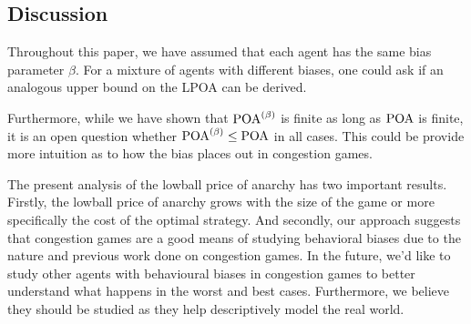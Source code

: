 \documentclass[twoside]{article}
\begin{document}
\begin{multicols}{2}

\section{Discussion}
Throughout this paper, we have assumed that each agent has the same bias
parameter $\beta$. For a mixture of agents with different biases, one could ask
if an analogous upper bound on the LPOA can be derived.

Furthermore, while we have shown that $\text{POA}^{(\beta)}$ is finite as long as $\text{POA}$ is
finite, it is an open question whether $\text{POA}^{(\beta)} \le \text{POA}$ in all cases.  This could be provide more intuition as to how the bias places out in congestion games.

The present analysis of the lowball price of anarchy has two important results.  Firstly, the lowball price of anarchy grows with the size of the game or more specifically the cost of the optimal strategy.  And secondly, our approach suggests that congestion games are a good means of studying behavioral biases due to the nature and previous work done on congestion games.  In the future, we'd like to study other agents with behavioural biases in congestion games to better understand what happens in the worst and best cases.  Furthermore, we believe they should be studied as they help descriptively model the real world.


\end{multicols}
\end{document}
